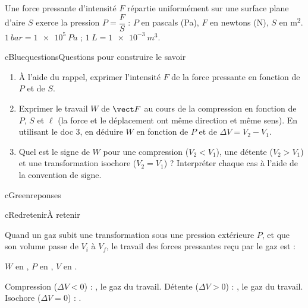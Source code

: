 \begin{rappel}
Une force pressante d’intensité $F$ répartie uniformément sur une surface plane d’aire $S$ exerce la pression $P = \dfrac{F}{S}$ : $P$ en pascals (Pa), $F$ en newtons (N), $S$ en \unit{m^2}. $\qty{1}{bar} = \qty{1e5}{Pa}$ ; $\qty{1}{L} = \qty{1e-3}{m^3}$.
\end{rappel}

\begin{rub}{cBlue}{questions}{Questions pour construire le savoir}
\begin{enumerate}
  \item {} À l’aide du rappel, exprimer l’intensité $F$ de la force pressante en fonction de $P$ et de $S$.
  \item {} Exprimer le travail $W$ de $\vect F$ au cours de la compression en fonction de $P$, $S$ et $\ell$ (la force et le déplacement ont même direction et même sens). En utilisant le doc 3, en déduire $W$ en fonction de $P$ et de $\Delta V = V_2 - V_1$.
  \item {} Quel est le signe de $W$ pour une compression ($V_2 < V_1$), une détente ($V_2 > V_1$) et une transformation isochore ($V_2 = V_1$) ? Interpréter chaque cas à l’aide de la convention de signe.
\end{enumerate}
\end{rub}

\begin{rub}{cGreen}{reponses}{\titrereponses}
\begin{reps}
  \item {}
  \item {}
  \item {}
\end{reps}
\end{rub}

\begin{rub}[colback=cRed!4!white, boxrule=1.4pt, unbreakable]{cRed}{retenir}{À retenir}
\ifeleve\RaggedRight\fi
{}\par\smallskip
Quand un gaz subit une transformation sous une pression extérieure  $P$, et que son volume passe de $V_i$ à $V_f$, le travail des forces pressantes reçu par le gaz est :
\begin{center}\end{center}
$W$ en , $P$ en , $V$ en .\par\smallskip
Compression ($\Delta V < 0$) : , le gaz  du travail. Détente ($\Delta V > 0$) : , le gaz  du travail. Isochore ($\Delta V = 0$) : .
\end{rub}

